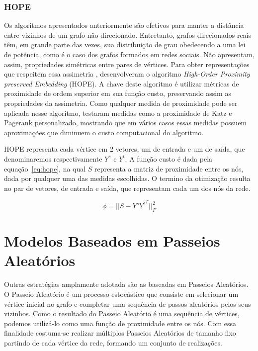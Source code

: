 \subsubsection{HOPE}

Os algoritmos apresentados anteriormente são efetivos para manter a distância
entre vizinhos de um grafo não-direcionado.
Entretanto, grafos direcionados reais têm, em grande parte das vezes, sua
distribuição de grau obedecendo a uma lei de potência, como é o caso dos grafos
formados em redes sociais.
Não apresentam, assim, propriedades simétricas entre pares de vértices.
Para obter representações que respeitem essa assimetria \citet{ou16},
desenvolveram o algoritmo \textit{High-Order Proximity preserved Embedding}
(HOPE).
A chave deste algoritmo é utilizar métricas de proximidade de ordem superior em
sua função custo, preservando assim as propriedades da assimetria.
Como qualquer medida de proximidade pode ser aplicada nesse algoritmo, \citet{ou16}
testaram medidas como a proximidade de Katz e Pagerank personalizado, mostrando
que em vários casos essas medidas possuem aproximações que diminuem o custo
computacional do algoritmo.

HOPE representa cada vértice em 2 vetores, um de entrada e um de saída, que
denominaremos respectivamente $Y^s$ e $Y^t$.
A função custo é dada pela equação~\ref{eq:hope}, na qual $S$ representa a matriz
de proximidade entre os nós, dada por qualquer uma das medidas escolhidas.
O termino da otimização resulta no par de vetores, de entrada e saída, que
representam cada um dos nós da rede.

\begin{equation} \label{eq:hope}
    \phi = \vert\vert S - Y^s {Y^t}^{T} \vert\vert^2_F
\end{equation}

\section{Modelos Baseados em Passeios Aleatórios}

Outras estratégias amplamente adotada são as baseadas em Passeios Aleatórios.
O Passeio Aleatório é um processo estocástico que consiste em selecionar um
vértice inicial no grafo e completar uma sequência de passos aleatórios pelos
seus vizinhos.
Como o resultado do Passeio Aleatório é uma sequência de vértices, podemos
utilizá-lo como uma função de proximidade entre os nós.
Com essa finalidade costuma-se realizar múltiplos Passeios Aleatórios de tamanho
fixo partindo de cada vértice da rede, formando um conjunto de realizações.

